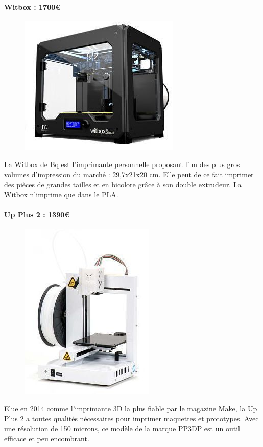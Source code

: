 \documentclass{article}
\begin{document}
\paragraph{Witbox : 1700\euro{}} \hfill \break
\begin{figure}[h!]
\centering
\includegraphics[scale=0.4]{./images/witbox.png}
\end{figure}\hfill \break
La Witbox de Bq est l'imprimante personnelle proposant l'un des plus gros volumes d'impression du marché : 29,7x21x20 cm. Elle peut de ce fait imprimer des pièces de grandes tailles et en bicolore grâce à son double extrudeur. La Witbox n'imprime que dans le PLA.
\newpage
\paragraph{Up Plus 2 : 1390\euro{}} \hfill \break
\begin{figure}[h!]
\centering
\includegraphics[scale=0.4]{./images/up-plus-2.png}
\end{figure}\hfill \break
Elue en 2014 comme l'imprimante 3D la plus fiable par le magazine Make, la Up Plus 2 a toutes qualités nécessaires pour imprimer maquettes et prototypes. Avec une résolution de 150 microns, ce modèle de la marque PP3DP est un outil efficace et peu encombrant.
\end{document}
